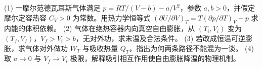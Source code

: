 (1) 一摩尔范德瓦耳斯气体满足 \(p=RT/(V-b)-a/V^2\)，参数 \(a,b>0\)，并假定摩尔定容热容 \(C_V>0\) 为常数。用热力学恒等式 \((\partial U/\partial V)_T=T(\partial p/\partial T)_V-p\) 求内能的体积依赖。
(2) 气体在绝热容器内向真空自由膨胀，从 \((T_i,V_i)\) 变为 \((T_f,V_f)\)，\(V_f>V_i>b\)，无对外功，求末温及合法条件。
(3) 若改成恒温可逆膨胀，求气体对外做功 \(W_T\) 与吸收热量 \(Q_T\)，指出为何两条路径不能混为一谈。
(4) 取 \(a\to0\) 与 \(V_f\to V_i\) 极限，解释吸引相互作用使自由膨胀降温的物理机制。
